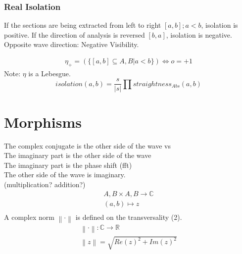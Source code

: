 \documentclass{report}
\newcommand\norm[1]{\left\lVert#1\right\rVert}
\begin{document}
\subsection{Real Isolation}
If the sections are being extracted from left to right $[a,b];a<b$, isolation is positive. If the direction of analysis is reversed $[b,a]$, isolation is negative.\\
Opposite wave direction: Negative Visibility.

\begin{align}
\eta_{+}=(\{[a,b] \subseteq A,B \vert a<b\}) \Leftrightarrow o=+1
\end{align}
Note: $\eta$ is a Lebesgue.
\begin{equation}
isolation(a,b)=\frac{s}{\lvert s \rvert} \prod straightness_{Abs}(a,b)
\end{equation}

\chapter{Morphisms}

The complex conjugate is the other side of the wave vs\\
The imaginary part is the other side of the wave\\
The imaginary part is the phase shift (fft)\\
The other side of the wave is imaginary.\\
(multiplication? addition?)
\begin{align}
A,B \times A,B \rightarrow \mathbb{C}\\
(a,b) \mapsto z\\
\end{align}
A complex norm $\norm{\cdot}$ is defined on the transversality (2).
\begin{align}
\norm{\cdot} : \mathbb{C} \rightarrow \mathbb{R}\\
\norm{z} = \sqrt{Re(z)^2+Im(z)^2}
\end{align}
\end{document}
